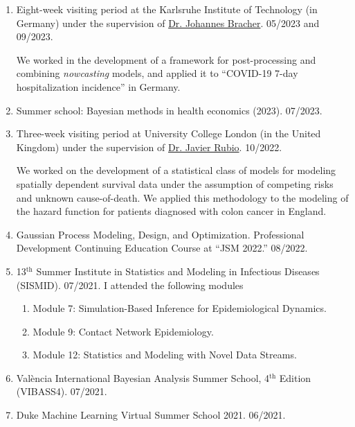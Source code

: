 \documentclass[10pt, ]{article}
\begin{document}
	\begin{enumerate}[noitemsep, topsep=0pt]
		\item Eight-week visiting period at the Karlsruhe Institute of Technology (in Germany) under the supervision of \href{https://jbracher.github.io/}{Dr. Johannes Bracher}. 05/2023 and 09/2023.\vspace{3pt}
		
		We worked in the development of a framework for post-processing and combining \textit{nowcasting} models, and applied it to ``COVID-19 7-day hospitalization incidence'' in Germany.\vspace{3pt}
		
		\item Summer school: Bayesian methods in health economics (2023).  07/2023.
		
		\item Three-week visiting period at University College London (in the United Kingdom) under the supervision of \href{https://sites.google.com/site/fjavierrubio67/}{Dr. Javier Rubio}. 10/2022.\vspace{3pt}
		
		We worked on the development of a statistical class of models for modeling spatially dependent survival data under the assumption of competing risks and unknown cause-of-death. We applied this methodology to the modeling of the hazard function for patients diagnosed with colon cancer in England.\vspace{3pt}
		
		
		\item Gaussian Process Modeling, Design, and Optimization. Professional Development Continuing Education Course at ``JSM 2022.'' 08/2022.
		
		\item 13${}^{\text{th}}$ Summer Institute in Statistics and Modeling in Infectious Diseases (SISMID). 07/2021. I attended the following modules \vspace{-6pt}
		\begin{enumerate}[label*=\arabic*., noitemsep]
			\item Module 7: Simulation-Based Inference for Epidemiological Dynamics.
			\item Module 9: Contact Network Epidemiology.
			\item Module 12: Statistics and Modeling with Novel Data Streams.
		\end{enumerate}
		
		\item València International Bayesian Analysis Summer School, 4${}^{\text{th}}$ Edition (VIBASS4). 07/2021.
		
		\item Duke Machine Learning Virtual Summer School 2021. 06/2021.
	\end{enumerate}
	
\end{document}
